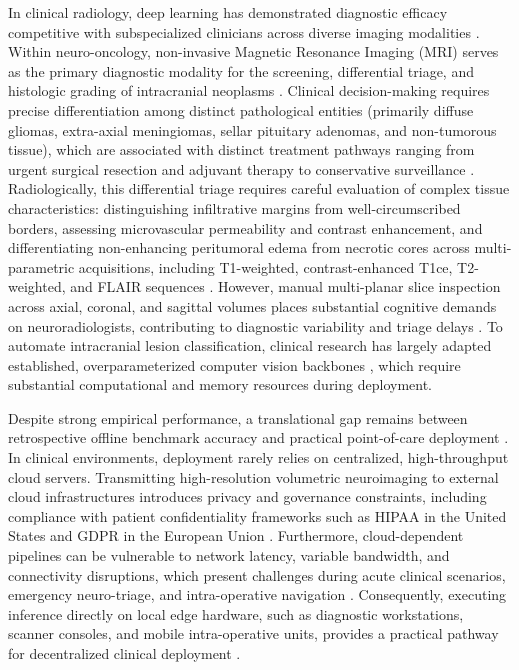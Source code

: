 \documentclass[journal]{IEEEtran}
\begin{document}
In clinical radiology, deep learning has demonstrated diagnostic efficacy competitive with subspecialized clinicians across diverse imaging modalities \cite{7, 28}. Within neuro-oncology, non-invasive Magnetic Resonance Imaging (MRI) serves as the primary diagnostic modality for the screening, differential triage, and histologic grading of intracranial neoplasms \cite{2, 26, 38}. Clinical decision-making requires precise differentiation among distinct pathological entities (primarily diffuse gliomas, extra-axial meningiomas, sellar pituitary adenomas, and non-tumorous tissue), which are associated with distinct treatment pathways ranging from urgent surgical resection and adjuvant therapy to conservative surveillance \cite{26, 40}. Radiologically, this differential triage requires careful evaluation of complex tissue characteristics: distinguishing infiltrative margins from well-circumscribed borders, assessing microvascular permeability and contrast enhancement, and differentiating non-enhancing peritumoral edema from necrotic cores across multi-parametric acquisitions, including T1-weighted, contrast-enhanced T1ce, T2-weighted, and FLAIR sequences \cite{2, 28, 38}. However, manual multi-planar slice inspection across axial, coronal, and sagittal volumes places substantial cognitive demands on neuroradiologists, contributing to diagnostic variability and triage delays \cite{7, 40}. To automate intracranial lesion classification, clinical research has largely adapted established, overparameterized computer vision backbones \cite{7, 39, 40}, which require substantial computational and memory resources during deployment.

Despite strong empirical performance, a translational gap remains between retrospective offline benchmark accuracy and practical point-of-care deployment \cite{21, 25}. In clinical environments, deployment rarely relies on centralized, high-throughput cloud servers. Transmitting high-resolution volumetric neuroimaging to external cloud infrastructures introduces privacy and governance constraints, including compliance with patient confidentiality frameworks such as HIPAA in the United States and GDPR in the European Union \cite{21}. Furthermore, cloud-dependent pipelines can be vulnerable to network latency, variable bandwidth, and connectivity disruptions, which present challenges during acute clinical scenarios, emergency neuro-triage, and intra-operative navigation \cite{21, 25}. Consequently, executing inference directly on local edge hardware, such as diagnostic workstations, scanner consoles, and mobile intra-operative units, provides a practical pathway for decentralized clinical deployment \cite{9, 20, 21}.
\end{document}
